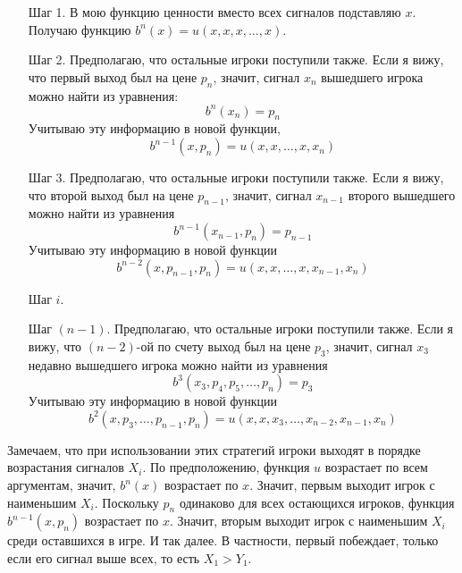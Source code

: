\begin{itemize}
\begin{enumerate}
\item[Шаг 1.] В мою функцию ценности вместо всех сигналов подставляю $ x $. Получаю функцию $b^{n}(x)=u(x,x,x,\ldots,x)$.
\item[Шаг 2.] Предполагаю, что остальные игроки поступили также. Если я вижу, что первый выход был на цене $ p_{n} $, значит, сигнал $x_{n}  $ вышедшего игрока можно найти из уравнения:
\begin{equation}
b^{n}(x_{n})=p_{n}
\end{equation}
Учитываю эту информацию в новой функции,
\begin{equation}
b^{n-1}(x,p_{n})=u(x,x,\ldots,x,x_{n})
\end{equation}
\item[Шаг 3.] Предполагаю, что остальные игроки поступили также. Если я вижу, что второй выход был на цене $ p_{n-1} $, значит, сигнал $ x_{n-1} $ второго вышедшего можно найти из уравнения
\begin{equation}
b^{n-1}(x_{n-1},p_{n})=p_{n-1}
\end{equation}
Учитываю эту информацию в новой функции
\begin{equation}
b^{n-2}(x,p_{n-1},p_{n})=u(x,x,\ldots,x,x_{n-1},x_{n})
\end{equation}
\item[Шаг $ i $.]

\item[Шаг $ (n-1) $.] Предполагаю, что остальные игроки поступили также. Если я вижу, что $ (n-2) $-ой по счету выход был на цене $ p_{3} $, значит, сигнал $ x_{3} $ недавно вышедшего игрока можно найти из уравнения
\begin{equation}
b^{3}(x_{3},p_{4},p_{5},\ldots,p_{n})=p_{3}
\end{equation}
Учитываю эту информацию в новой функции
\begin{equation}
b^{2}(x,p_{3},\ldots,p_{n-1},p_{n})=u(x,x,x_{3},\ldots,x_{n-2},x_{n-1},x_{n})
\end{equation}

\end{enumerate}

Замечаем, что при использовании этих стратегий игроки выходят в порядке возрастания сигналов $ X_{i} $. По предположению, функция $ u $ возрастает по всем аргументам, значит, $ b^{n}(x) $ возрастает по $ x $. Значит, первым выходит игрок с наименьшим $ X_{i} $. Поскольку $ p_{n} $ одинаково для всех остающихся игроков, функция $b^{n-1}(x,p_{n})$ возрастает по $x$. Значит, вторым выходит игрок с наименьшим $ X_{i} $ среди оставшихся в игре. И так далее. В частности, первый побеждает, только если его сигнал выше всех, то есть $ X_{1}>Y_{1} $.


\end{itemize}
